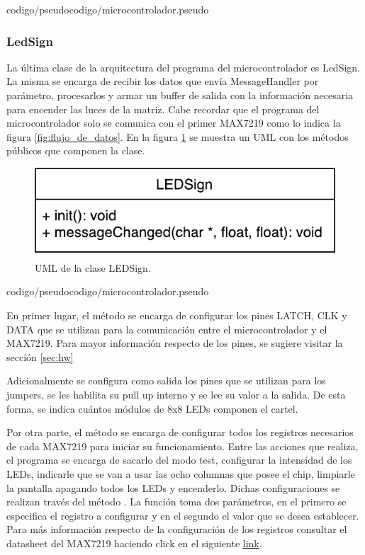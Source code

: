  {codigo/pseudocodigo/microcontrolador.pseudo}



\subsubsection{LedSign}

La última clase de la arquitectura del programa del microcontrolador es LedSign.
La misma se encarga de recibir los datos que envía MessageHandler por parámetro, procesarlos y armar un buffer de salida con la información necesaria para encender las luces de la matriz.
Cabe recordar que el programa del microcontrolador solo se comunica con el primer MAX7219 como lo indica la figura \ref{fig:flujo_de_datos}.
En la figura \ref{uml:ledSign} se muestra un UML con los métodos públicos que componen la clase.

\begin{figure}[!ht]
	\centering
	\includegraphics[scale=0.8]{imagenes/uml/LEDSign.pdf}
	\caption{UML de la clase LEDSign.}
	\label{uml:ledSign}
\end{figure}

 {codigo/pseudocodigo/microcontrolador.pseudo}

En primer lugar, el método  se encarga de configurar los pines LATCH, CLK y DATA que se utilizan para la comunicación entre el microcontrolador y el MAX7219.
Para mayor información respecto de los pines, se sugiere visitar la sección \ref{sec:hw} %

Adicionalmente se configura como salida los pines que se utilizan para los jumpers, se les habilita su pull up interno y se lee su valor a la salida.
De esta forma, se indica cuántos módulos de 8x8 LEDs componen el cartel.

Por otra parte, el método se encarga de configurar todos los registros necesarios de cada MAX7219 para iniciar su funcionamiento.
Entre las acciones que realiza, el programa se encarga de sacarlo del modo test, configurar la intensidad de los LEDs, indicarle que se van a usar las ocho columnas que posee el chip, limpiarle la pantalla apagando todos los LEDs y encenderlo.
Dichas configuraciones se realizan través del método .
La función toma dos parámetros, en el primero se especifica el registro a configurar y en el segundo el valor que se desea establecer.
Para más información respecto de la configuración de los registros consultar el datasheet del MAX7219 haciendo click en el siguiente \href{https://datasheets.maximintegrated.com/en/ds/MAX7219-MAX7221.pdf}{link}.


